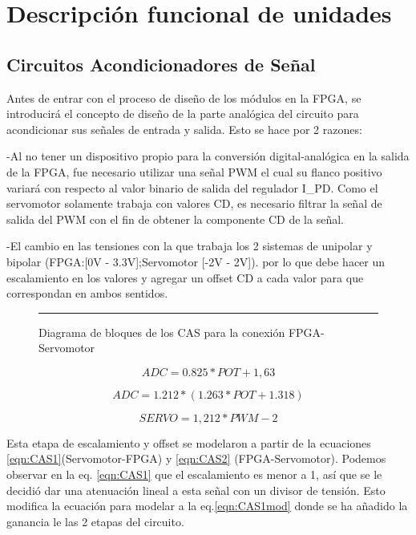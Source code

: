 \documentclass[12pt,a4paper]{article} %
\begin{document}
\section{Descripción funcional de unidades}


\subsection{Circuitos Acondicionadores de Señal}

Antes de entrar con el proceso de diseño de los módulos en la FPGA, se introducirá el concepto de diseño de la parte analógica del circuito para acondicionar sus señales de entrada y salida. Esto se hace por 2 razones:

-Al no tener un dispositivo propio para la conversión digital-analógica en la salida de la FPGA, fue necesario utilizar una señal PWM el cual su flanco positivo variará con respecto al valor binario de salida del regulador I\_PD. Como el servomotor solamente trabaja con valores CD, es necesario filtrar la señal de salida del PWM con el fin de obtener la componente CD de la señal.

-El cambio en las tensiones con la que trabaja los 2 sistemas de unipolar y bipolar (FPGA:[0V - 3.3V];Servomotor [-2V - 2V]). por lo que debe hacer un escalamiento en los valores y agregar un offset CD a cada valor para que correspondan en ambos sentidos.

\begin{figure}[htbp]
  \centering
    \rule{35em}{0.5pt}
  \caption[CAS]{Diagrama de bloques de los CAS para la conexión FPGA-Servomotor}
  \label{fig:CAS}
\end{figure}

\begin{equation}\label{eqn:CAS1}
ADC=0.825*POT+1,63
\end{equation}

\begin{equation}\label{eqn:CAS1mod}
ADC=1.212*(1.263*POT+1.318)
\end{equation}

\begin{equation}\label{eqn:CAS2}
SERVO=1,212*PWM-2
\end{equation}

Esta etapa de escalamiento y offset se modelaron a partir de la ecuaciones \ref{eqn:CAS1}(Servomotor-FPGA) y \ref{eqn:CAS2} (FPGA-Servomotor). Podemos observar en la eq. \ref{eqn:CAS1} que el escalamiento es menor a 1, así que se le decidió dar una atenuación lineal a esta señal con un divisor de tensión. Esto modifica la ecuación para modelar a la eq.\ref{eqn:CAS1mod} donde se ha añadido la ganancia le las 2 etapas del circuito.
\end{document}
